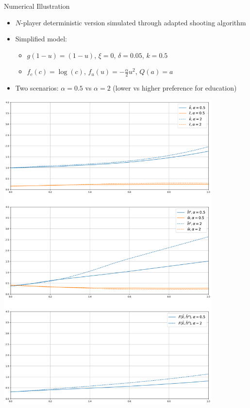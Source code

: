 \documentclass{beamer}
\begin{document}
\begin{frame}{Numerical Illustration}
\begin{itemize}
    \item $N$-player deterministic version simulated through adapted shooting algorithm
    \item Simplified model:
    \begin{itemize}
        \item $g(1- u) = (1 - u)$, $\xi = 0$, $\delta = 0.05$, $k = 0.5$
        \item $f_c(c) = \log(c)$, $f_u(u) = -\frac{\alpha}{2} u^2$, $Q(a) = a$
    \end{itemize}
    \item Two scenarios: $\alpha = 0.5$ vs $\alpha = 2$ (lower vs higher preference for education)
\end{itemize}

\includegraphics[width=0.85\textwidth]{../qualificacao/model_proposal/simulations/simulations_mfg.png}
\end{frame}
\end{document}
